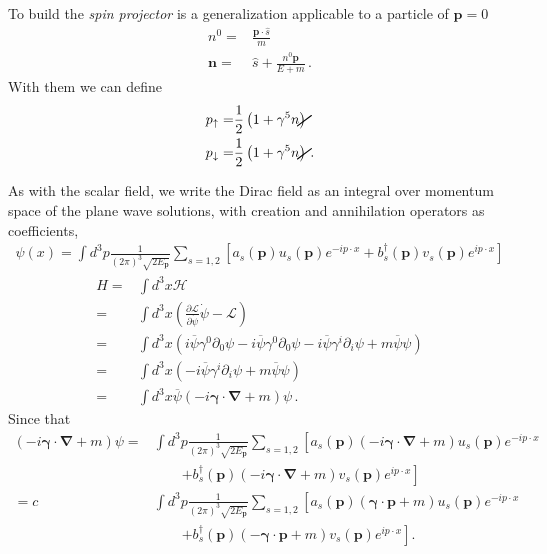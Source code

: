 To build the \emph{spin projector} is a generalization applicable to a
particle of $\mathbf{p}=0$
\begin{align*}
  n^0       =&\frac{\mathbf{p}\cdot\hat{s}}{m}\nonumber\\
  \mathbf{n}=&\hat{s}+\frac{n^0\mathbf{p}}{E+m}\,.
\end{align*}
With them we can define
\begin{align*}
  p_{\uparrow}=&\frac{1}{2} \left(1+\gamma^5\cancel{n}  \right)\nonumber\\
  p_{\downarrow}=&\frac{1}{2} \left(1+\gamma^5\cancel{n}  \right)\,.
\end{align*}



As with the scalar field, we write the Dirac field as an integral over momentum space of the plane wave solutions, with creation and annihilation operators as coefficients,
\begin{align}
  \psi(x)=\int d^3p\frac{1}{(2\pi)^3\sqrt{2 E_{\mathbf{p}}}}\sum_{s=1,2}\left[a_s(\mathbf{p})u_s(\mathbf{p})e^{-i p\cdot x}
+b_s^\dagger(\mathbf{p})v_s(\mathbf{p})e^{i p\cdot x}\right]
\end{align}
\begin{align}
  H=&\int d^3x \mathcal{H}\nonumber\\
=&\int d^3x\left(\frac{\partial \mathcal{L}}{\partial\dot\psi}\dot\psi -\mathcal{L}\right)\nonumber\\
  =&\int d^3x\left(i\overline{\psi}\gamma^0\partial_0\psi
-i\overline{\psi}\gamma^0\partial_0\psi-i\overline{\psi}\gamma^i\partial_i\psi+m\overline{\psi}\psi\right)\nonumber\\
 =&\int d^3x\left(-i\overline{\psi}\gamma^i\partial_i\psi+m\overline{\psi}\psi\right)\nonumber\\
 =&\int d^3x\overline{\psi}\left(-i\boldsymbol{\gamma}\cdot\boldsymbol{\nabla}+m\right)\psi\,.
\end{align}
Since that
\begin{align}
\label{eq:180}
  \left(-i\boldsymbol{\gamma}\cdot\boldsymbol{\nabla}+m\right)\psi=&
\int d^3p\frac{1}{(2\pi)^3\sqrt{2 E_{\mathbf{p}}}}\sum_{s=1,2}\left[a_s(\mathbf{p})\left(-i\boldsymbol{\gamma}\cdot\boldsymbol{\nabla}+m\right)u_s(\mathbf{p})e^{-i p\cdot x}\right.\nonumber\\
&\qquad\left.+b_s^\dagger(\mathbf{p})\left(-i\boldsymbol{\gamma}\cdot\boldsymbol{\nabla}+m\right)v_s(\mathbf{p})e^{i p\cdot x}\right]\nonumber\\
=c&\int d^3p\frac{1}{(2\pi)^3\sqrt{2 E_{\mathbf{p}}}}\sum_{s=1,2}\left[a_s(\mathbf{p})\left(\boldsymbol{\gamma}\cdot\mathbf{p}+m\right)u_s(\mathbf{p})e^{-i p\cdot x}\right.\nonumber\\
&\qquad\left.+b_s^\dagger(\mathbf{p})\left(-\boldsymbol{\gamma}\cdot\mathbf{p}+m\right)v_s(\mathbf{p})e^{i p\cdot x}\right].  
\end{align}
